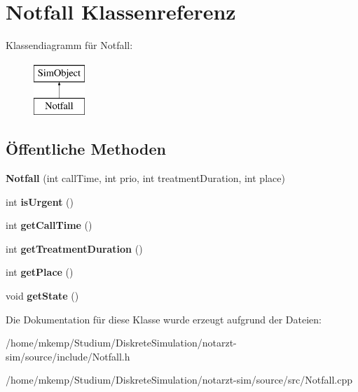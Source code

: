 \hypertarget{classNotfall}{}\section{Notfall Klassenreferenz}
\label{classNotfall}
Klassendiagramm für Notfall\+:\begin{figure}[H]
\begin{center}
\leavevmode
\includegraphics[height=2.000000cm]{classNotfall}
\end{center}
\end{figure}
\subsection*{Öffentliche Methoden}
\begin{DoxyCompactItemize}
\item 
{\bfseries Notfall} (int call\+Time, int prio, int treatment\+Duration, int place)\hypertarget{classNotfall_a7542c732e9bf644347982d4318b00f6e}{}\label{classNotfall_a7542c732e9bf644347982d4318b00f6e}

\item 
int {\bfseries is\+Urgent} ()\hypertarget{classNotfall_aaa4a4ffbf29b6a9bde87e89c5e182171}{}\label{classNotfall_aaa4a4ffbf29b6a9bde87e89c5e182171}

\item 
int {\bfseries get\+Call\+Time} ()\hypertarget{classNotfall_a020b9affed3c31a2de1ca25e186c14f6}{}\label{classNotfall_a020b9affed3c31a2de1ca25e186c14f6}

\item 
int {\bfseries get\+Treatment\+Duration} ()\hypertarget{classNotfall_ac7fc1ecdc2f4f5a599c48f1fc459ff33}{}\label{classNotfall_ac7fc1ecdc2f4f5a599c48f1fc459ff33}

\item 
int {\bfseries get\+Place} ()\hypertarget{classNotfall_a771c31393b277fc9d6ff72795fd9369d}{}\label{classNotfall_a771c31393b277fc9d6ff72795fd9369d}

\item 
void {\bfseries get\+State} ()\hypertarget{classNotfall_a3c65c33128d0c504f22bbefa301a0c95}{}\label{classNotfall_a3c65c33128d0c504f22bbefa301a0c95}

\end{DoxyCompactItemize}


Die Dokumentation für diese Klasse wurde erzeugt aufgrund der Dateien\+:\begin{DoxyCompactItemize}
\item 
/home/mkemp/\+Studium/\+Diskrete\+Simulation/notarzt-\/sim/source/include/Notfall.\+h\item 
/home/mkemp/\+Studium/\+Diskrete\+Simulation/notarzt-\/sim/source/src/Notfall.\+cpp\end{DoxyCompactItemize}
